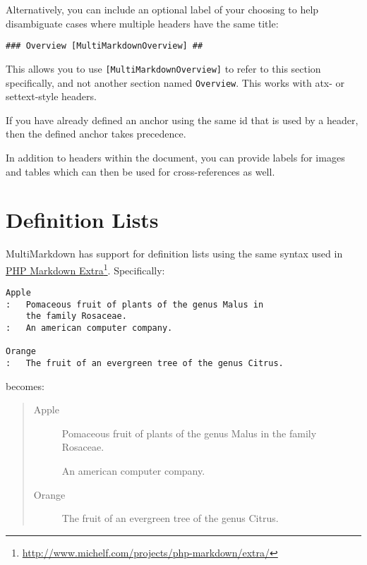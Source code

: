 Alternatively, you can include an optional label of your choosing to help
disambiguate cases where multiple headers have the same title:

\begin{verbatim}
### Overview [MultiMarkdownOverview] ##
\end{verbatim}

This allows you to use \texttt{[MultiMarkdownOverview]} to refer to this section
specifically, and not another section named \texttt{Overview}. This works with atx-
or settext-style headers.

If you have already defined an anchor using the same id that is used by a
header, then the defined anchor takes precedence.

In addition to headers within the document, you can provide labels for images
and tables which can then be used for cross-references as well.

\section{Definition Lists}
\label{definitionlists}

MultiMarkdown has support for definition lists using the same syntax used in
\href{http://www.michelf.com/projects/php-markdown/extra/}{PHP Markdown Extra}\footnote{\href{http://www.michelf.com/projects/php-markdown/extra/}{http:\slash{}\slash{}www.michelf.com\slash{}projects\slash{}php-markdown\slash{}extra\slash{}}}. Specifically:

\begin{verbatim}
Apple
:	Pomaceous fruit of plants of the genus Malus in 
	the family Rosaceae.
:	An american computer company.

Orange
:	The fruit of an evergreen tree of the genus Citrus.
\end{verbatim}

becomes:

\begin{quote}
\begin{description}
\item[Apple]

Pomaceous fruit of plants of the genus Malus in
the family Rosaceae.

An american computer company.

\item[Orange]

The fruit of an evergreen tree of the genus Citrus.
\end{description}
\end{quote}

